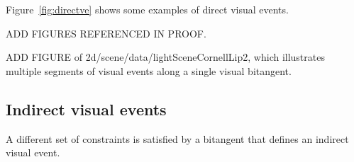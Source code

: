 \documentclass[12pt]{article}
\begin{document}
Figure~\ref{fig:directve} shows some examples of direct visual events.




ADD FIGURES REFERENCED IN PROOF.

ADD FIGURE of 2d/scene/data/lightSceneCornellLip2, which illustrates multiple segments
of visual events along a single visual bitangent.


\clearpage

\subsection{Indirect visual events}

A different set of constraints is satisfied by a bitangent that defines
an indirect visual event. %
\end{document}
